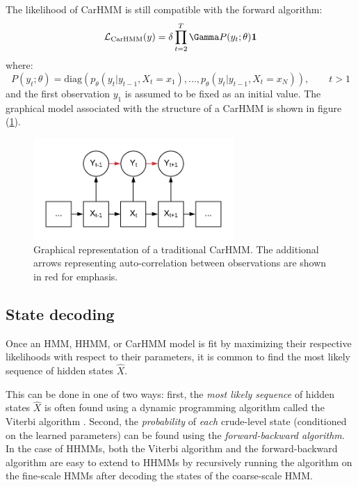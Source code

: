 The likelihood of CarHMM is still compatible with the forward algorithm:
\begin{equation}
\calL_{\text{CarHMM}}(y) = \delta \prod_{t=2}^T \Gamma P(y_t;\theta) \mathbf{1}
\label{CarHMM_likelihood}
\end{equation}
where:
%
$$P(y_t;\theta) = \text{diag}(p_\theta(y_t|y_{t-1},X_t = x_1), . . . , p_\theta(y_t|y_{t-1},X_t = x_N )), \qquad t > 1$$
%
and the first observation $y_1$ is assumed to be fixed as an initial value. The graphical model associated with the structure of a CarHMM is shown in figure (\ref{fig:CarHMM}).

\begin{figure}[h!]
	\centering
	\includegraphics[width=3in]{../Plots/CarHMM.png}
	\caption{Graphical representation of a traditional CarHMM. The additional arrows representing auto-correlation between observations are shown in red for emphasis.}
	\label{fig:CarHMM}
\end{figure}


\subsection{State decoding}

Once an HMM, HHMM, or CarHMM model is fit by maximizing their respective likelihoods with respect to their parameters, it is common to find the most likely sequence of hidden states $\hat X$. 

This can be done in one of two ways: first, the \textit{most likely sequence} of  hidden states $\hat X$ is often found using a dynamic programming algorithm called the Viterbi algorithm \cite{Viterbi:1967}. Second, the \textit{probability} of \textit{each} crude-level state (conditioned on the learned parameters) can be found using the \textit{forward-backward algorithm}. In the case of HHMMs, both the Viterbi algorithm and the forward-backward algorithm are easy to extend to HHMMs by recursively running the algorithm on the fine-scale HMMs after decoding the states of the coarse-scale HMM.

